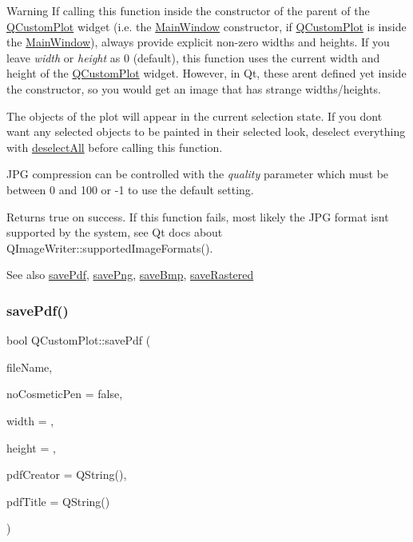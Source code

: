 \begin{DoxyWarning}{Warning}
If calling this function inside the constructor of the parent of the \mbox{\hyperlink{class_q_custom_plot}{Q\+Custom\+Plot}} widget (i.\+e. the \mbox{\hyperlink{class_main_window}{Main\+Window}} constructor, if \mbox{\hyperlink{class_q_custom_plot}{Q\+Custom\+Plot}} is inside the \mbox{\hyperlink{class_main_window}{Main\+Window}}), always provide explicit non-\/zero widths and heights. If you leave {\itshape width} or {\itshape height} as 0 (default), this function uses the current width and height of the \mbox{\hyperlink{class_q_custom_plot}{Q\+Custom\+Plot}} widget. However, in Qt, these aren\textquotesingle{}t defined yet inside the constructor, so you would get an image that has strange widths/heights.
\end{DoxyWarning}
The objects of the plot will appear in the current selection state. If you don\textquotesingle{}t want any selected objects to be painted in their selected look, deselect everything with \mbox{\hyperlink{class_q_custom_plot_a9d4808ab925b003054085246c92a257c}{deselect\+All}} before calling this function.

J\+PG compression can be controlled with the {\itshape quality} parameter which must be between 0 and 100 or -\/1 to use the default setting.

Returns true on success. If this function fails, most likely the J\+PG format isn\textquotesingle{}t supported by the system, see Qt docs about Q\+Image\+Writer\+::supported\+Image\+Formats().

\begin{DoxySeeAlso}{See also}
\mbox{\hyperlink{class_q_custom_plot_a632da44c6d94ea8b271eb483b08b5114}{save\+Pdf}}, \mbox{\hyperlink{class_q_custom_plot_a7636261aff1f6d25c9da749ece3fc8b8}{save\+Png}}, \mbox{\hyperlink{class_q_custom_plot_a6629d9e8e6da4bf18055ee0257fdce9a}{save\+Bmp}}, \mbox{\hyperlink{class_q_custom_plot_ab528b84cf92baabe29b1d0ef2f77c93e}{save\+Rastered}} 
\end{DoxySeeAlso}
\mbox{\label{class_q_custom_plot_a632da44c6d94ea8b271eb483b08b5114}} 
\subsubsection{\texorpdfstring{save\+Pdf()}{savePdf()}}
{\footnotesize\ttfamily bool Q\+Custom\+Plot\+::save\+Pdf (\begin{DoxyParamCaption}\item[{const Q\+String \&}]{file\+Name,  }\item[{bool}]{no\+Cosmetic\+Pen = {\ttfamily false},  }\item[{int}]{width = {},  }\item[{int}]{height = {},  }\item[{const Q\+String \&}]{pdf\+Creator = {\ttfamily QString()},  }\item[{const Q\+String \&}]{pdf\+Title = {\ttfamily QString()} }\end{DoxyParamCaption})}

